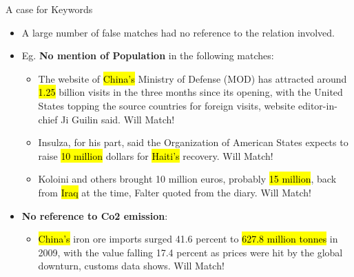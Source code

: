 \documentclass{beamer}
\makeatletter
\newcommand\SoulColor{%
  \let\set@color\beamerorig@set@color
  \let\reset@color\beamerorig@reset@color}
\makeatother
\begin{document}
\begin{frame}{A case for Keywords}
 \begin{itemize}
  \item A large number of false matches had no reference to the relation involved.
  \item Eg. \textbf{No mention of Population} in the following matches:
  \begin{itemize}
  \item The website of \SoulColor\hl{China's} Ministry of Defense (MOD) has attracted around \SoulColor\hl{1.25} billion visits in the three months since its opening, with the United States topping the source countries for foreign visits, website editor-in-chief Ji Guilin said. {\color{red} Will Match!}
  \item Insulza, for his part, said the Organization of American States expects to raise \SoulColor\hl{10 million} dollars for \SoulColor\hl{Haiti's} recovery. {\color{red} Will Match!}
  \item Koloini and others brought 10 million euros, probably \SoulColor\hl{15 million}, back from \SoulColor\hl{Iraq} at the time, Falter quoted from the diary. {\color{red} Will Match!}
 \end{itemize}
\item \textbf{No reference to Co2 emission}:
 \begin{itemize}
 \item \SoulColor\hl{China's} iron ore imports surged 41.6 percent to \SoulColor\hl{627.8 million tonnes} in 2009, with the value falling 17.4 percent as prices were hit by the global downturn, customs data shows. {\color{red} Will Match!}
 \end{itemize}
 \end{itemize}
\end{frame}
\end{document}
